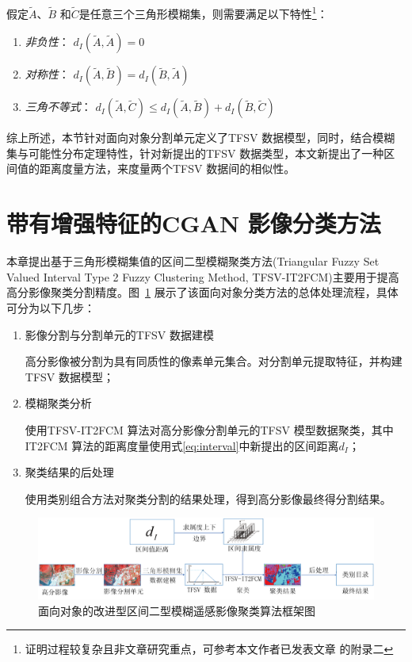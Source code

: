 假定$\tilde{A}$、$\tilde{B}$ 和$\tilde{C}$是任意三个三角形模糊集，则需要满足以下特性\footnote{证明过程较复杂且非文章研究重点，可参考本文作者已发表文章\cite{jiang2018enhanced} 的附录二}：
\begin{enumerate}[(1)]
    \item \textsl{非负性}： $d_I(\tilde{A}, \tilde{A}) = 0$
    \item\textsl{对称性}： $d_I(\tilde{A}, \tilde{B}) = d_I(\tilde{B}, \tilde{A})$
    \item  \textsl{三角不等式}： $d_I(\tilde{A}, \tilde{C}) \leq d_I(\tilde{A}, \tilde{B}) + d_I(\tilde{B}, \tilde{C})$
\end{enumerate}


综上所述，本节针对面向对象分割单元定义了TFSV 数据模型，同时，结合模糊集与可能性分布定理特性，针对新提出的TFSV 数据类型，本文新提出了一种区间值的距离度量方法，来度量两个TFSV 数据间的相似性。


\section{带有增强特征的CGAN 影像分类方法}
\label{sec::chap04-3}


本章提出基于三角形模糊集值的区间二型模糊聚类方法(Triangular Fuzzy Set Valued Interval Type 2 Fuzzy Clustering Method, TFSV-IT2FCM)主要用于提高高分影像聚类分割精度。图~\ref{fig:framework} 展示了该面向对象分类方法的总体处理流程，具体可分为以下几步：

\begin{enumerate}[Step 1:]
    \item 影像分割与分割单元的TFSV 数据建模

          高分影像被分割为具有同质性的像素单元集合。对分割单元提取特征，并构建 TFSV 数据模型；
    \item 模糊聚类分析

          使用TFSV-IT2FCM 算法对高分影像分割单元的TFSV 模型数据聚类，其中IT2FCM 算法的距离度量使用式\ref{eq:interval}中新提出的区间距离$d_I$；
    \item 聚类结果的后处理

          使用类别组合方法对聚类分割的结果处理，得到高分影像最终得分割结果。
\end{enumerate}

\begin{figure}[htb]
    \centering
    \includegraphics[width=1.0\textwidth]{figures/framework}
    \caption{面向对象的改进型区间二型模糊遥感影像聚类算法框架图}
    \label{fig:framework}
\end{figure}



